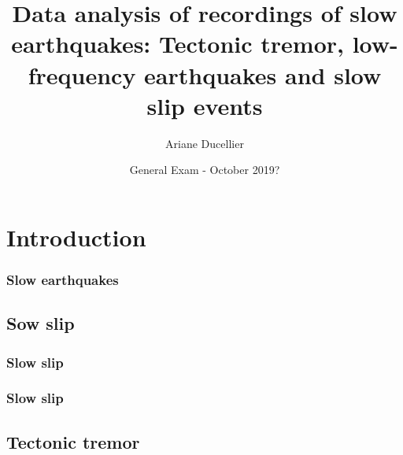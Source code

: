 \documentclass{beamer}
\title[Data analysis of recordings of slow earthquakes]{Data analysis of recordings of slow earthquakes: Tectonic tremor, low-frequency earthquakes and slow slip events}
\author{Ariane Ducellier}
\institute{University of Washington}
\date{General Exam - October 2019?}
\begin{document}
	\begin{frame}
		\titlepage
	\end{frame}


	\section{Introduction}

	\begin{frame}
		\frametitle{Slow earthquakes}
	\end{frame}


	\subsection{Sow slip}

	\begin{frame}
		\frametitle{Slow slip}
	\end{frame}

	\begin{frame}
		\frametitle{Slow slip}
	\end{frame}


	\subsection{Tectonic tremor}
\end{document}

